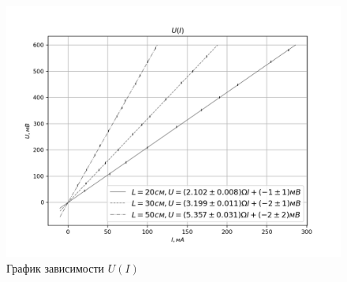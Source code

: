 \documentclass[a4paper, 12pt]{article}
\begin{document}
    \newpage
    \begin{figure}
        \includegraphics[scale=1]{grafik.png}
        \caption{График зависимости $U(I)$}
    \end{figure}
\end{document}
